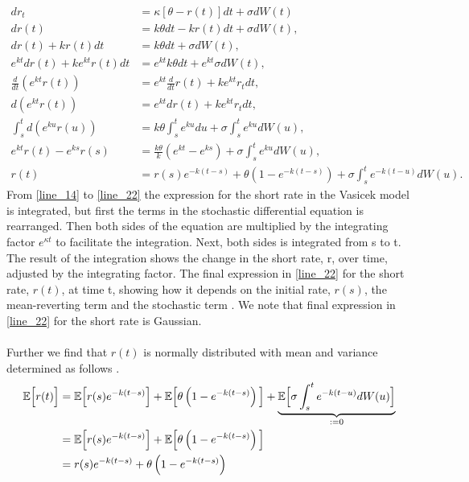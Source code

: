 \begin{align}
    d r_t &= \kappa \left[\theta - r(t)\right] dt + \sigma d W(t) \label{line_14} \\
    d r(t) &= k \theta dt - k r(t) dt + \sigma d W(t),  \\
    d r(t) + k r(t) dt &= k \theta dt + \sigma d W(t), \\
    e^{kt} d r(t) + k e^{kt} r(t) dt &= e^{kt} k \theta dt + e^{kt} \sigma d W(t), \\
    \frac{d}{dt} \left( e^{k t} r(t) \right) &= e^{k t} \frac{d}{dt} r(t) + k e^{k t} r_t dt, \\
    d\left( e^{k t} r(t) \right) &= e^{k t} dr(t) + k e^{k t} r_t dt, \\
    \int_s^t d \left( e^{ku} r(u) \right) &= k \theta \int_s^t e^{ku} du + \sigma \int_s^t e^{ku} d W(u), \\
    e^{kt} r(t) - e^{k s} r(s) &= \frac{k \theta}{k} \left( e^{kt} - e^{ks} \right) + \sigma \int_s^t e^{ku} d W(u), \\
    r(t) &= r(s) e^{-k(t-s)} + \theta \left( 1 - e^{-k(t-s)} \right) + \sigma \int_s^t e^{-k(t-u)} d W(u). \label{line_22}
\end{align}
From \autoref{line_14} to \autoref{line_22} the expression for the short rate in the Vasicek model is integrated, 
but first the terms in the stochastic differential equation is rearranged.
Then both sides of the equation are multiplied by the 
integrating factor $e^{\kappa t}$ to facilitate the integration. Next, both sides is integrated from s to t. The result of the
integration shows the change in the short  rate, r, over time, adjusted by the integrating factor. The final 
expression in \autoref{line_22} for the short rate, $r(t)$, at time t, showing how it depends on the initial rate, $r(s)$,
the mean-reverting term and the stochastic term \cite{Bermudan}. We note that  final expression in \autoref{line_22} for the short rate
is Gaussian.
\\\\
Further we find that $r(t)$ is normally distributed with mean and variance determined as follows \cite{Bjork}. 
\begin{align*}
    \mathbb{E} \Big[r(t)\Big] & = \mathbb{E} \Big[ r(s) e^{-k(t-s)} \Big] + \mathbb{E} \Big[\theta \left( 1 - e^{-k(t-s)} \right)\Big]
    + \underset{:=0}{\underbrace{\mathbb{E} \Big[\sigma \int_s^t e^{-k(t-u)} d W(u)\Big] }}\\
    & = \mathbb{E} \Big[ r(s) e^{-k(t-s)} \Big] + \mathbb{E} \Big[\theta \left( 1 - e^{-k(t-s)} \right)\Big] \\
    & = r(s) e^{-k(t-s)} + \theta \left( 1 - e^{-k(t-s)} \right) 
\end{align*}    
